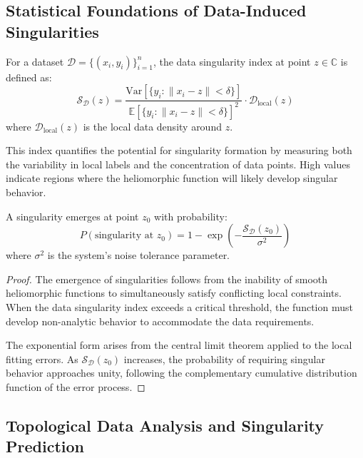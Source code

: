 \begin{definition}
\begin{enumerate}
\subsection{Statistical Foundations of Data-Induced Singularities}

\begin{definition}
For a dataset $\mathcal{D} = \{(x_i, y_i)\}_{i=1}^n$, the data singularity index at point $z \in \mathbb{C}$ is defined as:
\begin{equation}
\mathcal{S}_{\mathcal{D}}(z) = \frac{\text{Var}[\{y_i : \|x_i - z\| < \delta\}]}{\mathbb{E}[\{y_i : \|x_i - z\| < \delta\}]^2} \cdot \mathcal{D}_{\text{local}}(z)
\end{equation}
where $\mathcal{D}_{\text{local}}(z)$ is the local data density around $z$.
\end{definition}

This index quantifies the potential for singularity formation by measuring both the variability in local labels and the concentration of data points. High values indicate regions where the heliomorphic function will likely develop singular behavior.

\begin{theorem}
A singularity emerges at point $z_0$ with probability:
\begin{equation}
P(\text{singularity at } z_0) = 1 - \exp\left(-\frac{\mathcal{S}_{\mathcal{D}}(z_0)}{\sigma^2}\right)
\end{equation}
where $\sigma^2$ is the system's noise tolerance parameter.
\end{theorem}

\begin{proof}
The emergence of singularities follows from the inability of smooth heliomorphic functions to simultaneously satisfy conflicting local constraints. When the data singularity index exceeds a critical threshold, the function must develop non-analytic behavior to accommodate the data requirements.

The exponential form arises from the central limit theorem applied to the local fitting errors. As $\mathcal{S}_{\mathcal{D}}(z_0)$ increases, the probability of requiring singular behavior approaches unity, following the complementary cumulative distribution function of the error process.
\end{proof}

\subsection{Topological Data Analysis and Singularity Prediction}


\end{enumerate}
\end{definition}
